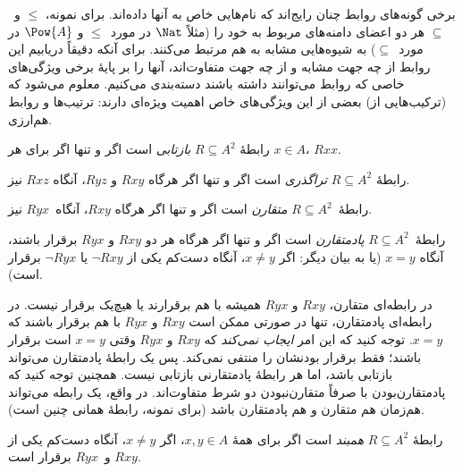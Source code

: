 \documentclass[../../../include/open-logic-section]{subfiles}
\begin{document}

\begin{intro}
برخی گونه‌های روابط چنان رایج‌اند که نام‌هایی خاص به آنها داده‌اند.
برای نمونه، $\le$ و~$\subseteq$ هر دو اعضای دامنه‌های مربوط به خود را
(مثلاً $\Nat$ در مورد~$\le$ و $\Pow{A}$ در مورد~$\subseteq$) به
شیوه‌هایی مشابه به هم مرتبط می‌کنند. برای آنکه دقیقاً دریابیم این روابط
از چه جهت مشابه و از چه جهت متفاوت‌اند، آنها را بر پایهٔ برخی ویژگی‌های
خاصی که روابط می‌توانند داشته باشند دسته‌بندی می‌کنیم. معلوم می‌شود که
(ترکیب‌هایی از) بعضی از این ویژگی‌های خاص اهمیت ویژه‌ای دارند: ترتیب‌ها
و روابط هم‌ارزی.
\end{intro}

\begin{defn}
رابطهٔ $R \subseteq A^2$ \emph{بازتابی} است اگر و تنها اگر برای هر $x \in
A$، $Rxx$.
\end{defn}

\begin{defn}[تراگذری]
رابطهٔ $R \subseteq A^2$ \emph{تراگذری} است اگر و تنها اگر هرگاه $Rxy$
و $Ryz$، آنگاه $Rxz$ نیز.
\end{defn}

\begin{defn}[تقارن]
رابطهٔ~$R \subseteq A^2$ \emph{متقارن} است اگر و تنها اگر هرگاه
$Rxy$، آنگاه~$Ryx$ نیز.
\end{defn}

\begin{defn}[پادتقارنی]
رابطهٔ~$R \subseteq A^2$ \emph{پاد\-مت\-قارن} است اگر و تنها اگر هرگاه هر دو
$Rxy$ و $Ryx$ برقرار باشند، آنگاه $x=y$ (یا به بیان دیگر: اگر $x\neq y$،
آنگاه دست‌کم یکی از $\lnot Rxy$ یا $\lnot Ryx$ برقرار است).
\end{defn}

\begin{explain}
در رابطه‌ای متقارن، $Rxy$ و $Ryx$ همیشه با هم برقرارند یا هیچ‌یک برقرار
نیست. در رابطه‌ای پادمتقارن، تنها در صورتی ممکن است $Rxy$ و $Ryx$ با هم
برقرار باشند که $x = y$. توجه کنید که این امر \emph{ایجاب نمی‌کند} که
$Rxy$ و $Ryx$ وقتی $x = y$ است برقرار باشند؛ فقط برقرار بودنشان را منتفی
نمی‌کند. پس یک رابطهٔ پادمتقارن می‌تواند بازتابی باشد، اما هر رابطهٔ
پادمتقارنی بازتابی نیست. همچنین توجه کنید که پادمتقارن‌بودن با صرفاً
متقارن‌نبودن دو شرط متفاوت‌اند. در واقع، یک رابطه می‌تواند هم‌زمان هم
متقارن و هم پادمتقارن باشد (برای نمونه، رابطهٔ همانی چنین است).
\end{explain}

\begin{defn}[همبندی]
رابطهٔ $R \subseteq A^2$ \emph{همبند} است اگر برای همهٔ $x,y\in
A$، اگر $x \neq y$، آنگاه دست‌کم یکی از $Rxy$ و~$Ryx$ برقرار است.
\end{defn}
\end{document}
